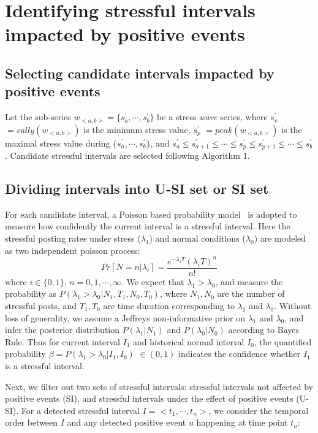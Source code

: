 \newpage

\appendix
\section{Identifying stressful intervals impacted by positive events}
\subsection{Selecting candidate intervals impacted by positive events}
\label{alg:alg1}
Let the sub-series $w_{<a,b>} = \{s^{'}_a, \cdots, s^{'}_b\}$ be a stress \emph{wave} series,
where $s^{'}_v$ $= {vally(w_{<a,b>})}$ is the minimum stress value,
$s^{'}_p$ $= peak(w_{<a,b>})$ is the maximal stress value during $\{s^{'}_a,\cdots,s^{'}_b\}$,
and $s^{'}_a \leq s^{'}_{a+1} \leq \cdots \leq s^{'}_p \leq s^{'}_{p+1} \leq \cdots \leq s^{'}_b$.
Candidate stressful intervals are selected following Algorithm 1.

\subsection{Dividing intervals into U-SI set or SI set}
\label{alg:alg2}
For each candidate interval,
a Poisson based probability model~\cite{Li2017Analyzing} is adopted to measure how confidently the current interval is a stressful interval.
Here the stressful posting rates under stress ($\lambda_1$) and normal conditions ($\lambda_0$) are modeled as two independent poisson process:
\begin{equation}
Pr[N=n|\lambda_i]=\frac{e^{-\lambda_i T}{(\lambda_i T)}^n}{n!}
\end{equation}
where $i\in\{0,1\}$, $n=0,1,\cdots,\infty$.
We expect that $\lambda_1 > \lambda_0$, and measure the probability as $P(\lambda_1>\lambda_0|N_1, T_1, N_0, T_0)$,
where $N_1, N_0$ are the number of stressful posts, and $T_1, T_0$ are time duration corresponding to $\lambda_1$ and $\lambda_0$.
Without loss of generality, we assume a Jeffreys non-informative prior on $\lambda_1$ and $\lambda_0$,
and infer the posterior distribution $P(\lambda_1|N_1)$ and $P(\lambda_0|N_0)$ according to Bayes Rule.
Thus for current interval $I_1$ and historical normal interval $I_0$,
the quantified probability $\beta = P(\lambda_1>\lambda_0|I_1,I_0)$ $\in (0,1)$ indicates the confidence whether $I_1$ is a stressful interval.

Next, we filter out two sets of stressful intervals: stressful intervals not affected by positive events (SI),
and stressful intervals under the effect of positive events (U-SI).
For a detected stressful interval $I = <t_1,\cdots,t_n>$, we consider the temporal order between $I$ and any detected positive event $u$ happening at time point $t_u$:
